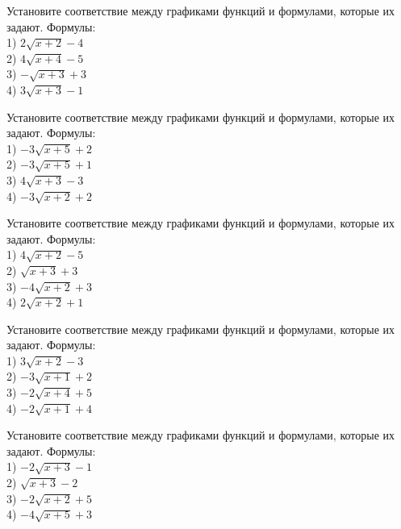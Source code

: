 \documentclass[4apaper]{article}
\begin{document}
\begin{taskBN}{76}
Установите соответствие между графиками функций и формулами, которые их задают. Формулы: \\1) $2\sqrt{x+2}-4$\\2) $4\sqrt{x+4}-5$\\3) $-\sqrt{x+3}+3$\\4) $3\sqrt{x+3}-1$
\end{taskBN}

\begin{taskBN}{77}
Установите соответствие между графиками функций и формулами, которые их задают. Формулы: \\1) $-3\sqrt{x+5}+2$\\2) $-3\sqrt{x+5}+1$\\3) $4\sqrt{x+3}-3$\\4) $-3\sqrt{x+2}+2$
\end{taskBN}

\begin{taskBN}{78}
Установите соответствие между графиками функций и формулами, которые их задают. Формулы: \\1) $4\sqrt{x+2}-5$\\2) $\sqrt{x+3}+3$\\3) $-4\sqrt{x+2}+3$\\4) $2\sqrt{x+2}+1$
\end{taskBN}

\begin{taskBN}{79}
Установите соответствие между графиками функций и формулами, которые их задают. Формулы: \\1) $3\sqrt{x+2}-3$\\2) $-3\sqrt{x+1}+2$\\3) $-2\sqrt{x+4}+5$\\4) $-2\sqrt{x+1}+4$
\end{taskBN}

\begin{taskBN}{80}
Установите соответствие между графиками функций и формулами, которые их задают. Формулы: \\1) $-2\sqrt{x+3}-1$\\2) $\sqrt{x+3}-2$\\3) $-2\sqrt{x+2}+5$\\4) $-4\sqrt{x+5}+3$
\end{taskBN}
\end{document}
